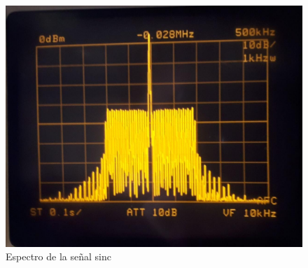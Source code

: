 \begin{figure}[H]
    \centering
    \includegraphics[scale=0.2]{../Mediciones/Ejercicio_8/ej8_espectro_sinc.jpeg}
    \caption{Espectro de la se\~nal sinc}
    \label{fig:ej8_espectro_sinc}
\end{figure}

